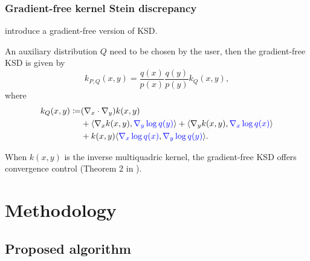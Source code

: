 \documentclass{beamer}
\begin{document}
\begin{frame}
\frametitle{Gradient-free kernel Stein discrepancy}

\cite{fisherGradientFreeKernelStein2024} introduce a gradient-free version of KSD.

An auxiliary distribution $Q$ need to be chosen by the user, then the gradient-free KSD is given by
\begin{equation*}
k_{P,Q}(x, y) = \frac{q(x)}{p(x)} \frac{q(y)}{p(y)} k_Q(x, y),
\end{equation*}
where
\begin{equation*}
\begin{aligned}
k_Q(x, y) \coloneq 
&(\nabla_x\cdot\nabla_y) k(x,y) \\
&+ \langle \nabla_x k(x, y), \textcolor{blue}{\nabla_y \log q(y)} \rangle + \langle \nabla_y k(x, y), \textcolor{blue}{\nabla_x \log q(x)} \rangle \\
&+ k(x, y) \langle \textcolor{blue}{\nabla_x \log q(x)}, \textcolor{blue}{\nabla_y \log q(y)} \rangle.
\end{aligned}
\end{equation*}

When $k(x,y)$ is the inverse multiquadric kernel, the gradient-free KSD offers convergence control (Theorem 2 in \cite{fisherGradientFreeKernelStein2024}).

\end{frame}

\section{Methodology}

\subsection{Proposed algorithm}
\end{document}
